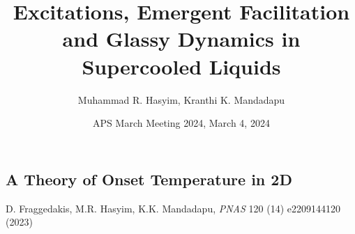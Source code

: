 \documentclass[9pt,professionalfont,t,aspectratio=169]{beamer}
\title{Excitations, Emergent Facilitation and Glassy Dynamics in Supercooled Liquids}
\date{APS March Meeting 2024, March 4, 2024}
\author{Muhammad R. Hasyim\inst{1}, Kranthi K. Mandadapu\inst{2}}
\institute[Affiliations]{
    \inst{1}%
    Department of Chemical and Biomolecular Engineering, University of California, Berkeley, CA 94720
    
    \inst{2}%
    Chemical Division, Lawrence Berkeley National Laboratory, Berkeley, CA 94720
}
\begin{document}
\maketitle 









\begin{frame}
\vspace{20pt}
\section{A Theory of Onset Temperature in 2D}

\centering{}%

D. Fraggedakis, M.R. Hasyim, K.K. Mandadapu, \textit{PNAS} 120 (14) e2209144120 (2023)

\end{frame}

















\end{document}
